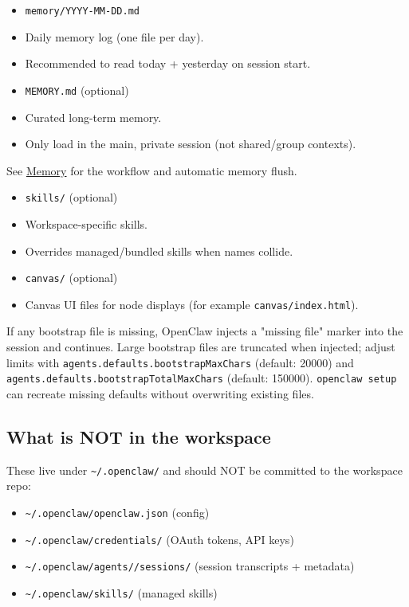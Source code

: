 \begin{itemize}
  \item \texttt{memory/YYYY-MM-DD.md}
  \item Daily memory log (one file per day).
  \item Recommended to read today + yesterday on session start.
\end{itemize}


\begin{itemize}
  \item \texttt{MEMORY.md} (optional)
  \item Curated long-term memory.
  \item Only load in the main, private session (not shared/group contexts).
\end{itemize}


See \href{/concepts/memory}{Memory} for the workflow and automatic memory flush.

\begin{itemize}
  \item \texttt{skills/} (optional)
  \item Workspace-specific skills.
  \item Overrides managed/bundled skills when names collide.
\end{itemize}


\begin{itemize}
  \item \texttt{canvas/} (optional)
  \item Canvas UI files for node displays (for example \texttt{canvas/index.html}).
\end{itemize}


If any bootstrap file is missing, OpenClaw injects a "missing file" marker into
the session and continues. Large bootstrap files are truncated when injected;
adjust limits with \texttt{agents.defaults.bootstrapMaxChars} (default: 20000) and
\texttt{agents.defaults.bootstrapTotalMaxChars} (default: 150000).
\texttt{openclaw setup} can recreate missing defaults without overwriting existing
files.

\subsection{What is NOT in the workspace}


These live under \texttt{\textasciitilde{}/.openclaw/} and should NOT be committed to the workspace repo:

\begin{itemize}
  \item \texttt{\textasciitilde{}/.openclaw/openclaw.json} (config)
  \item \texttt{\textasciitilde{}/.openclaw/credentials/} (OAuth tokens, API keys)
  \item \texttt{\textasciitilde{}/.openclaw/agents//sessions/} (session transcripts + metadata)
  \item \texttt{\textasciitilde{}/.openclaw/skills/} (managed skills)
\end{itemize}


